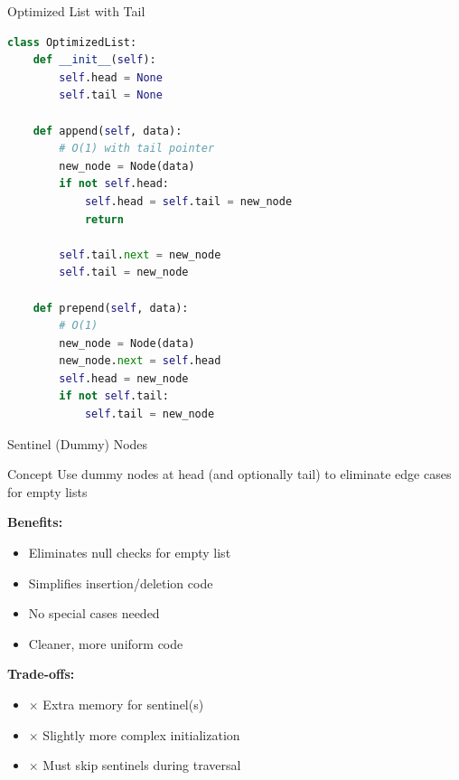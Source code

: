\documentclass[aspectratio=169,xcolor=dvipsnames]{beamer}
\begin{document}
\begin{frame}[fragile]{Optimized List with Tail}
\begin{lstlisting}[language=Python, basicstyle=\small\ttfamily]
class OptimizedList:
    def __init__(self):
        self.head = None
        self.tail = None

    def append(self, data):
        # O(1) with tail pointer
        new_node = Node(data)
        if not self.head:
            self.head = self.tail = new_node
            return

        self.tail.next = new_node
        self.tail = new_node

    def prepend(self, data):
        # O(1)
        new_node = Node(data)
        new_node.next = self.head
        self.head = new_node
        if not self.tail:
            self.tail = new_node
\end{lstlisting}
\end{frame}

\begin{frame}{Sentinel (Dummy) Nodes}
  \begin{block}{Concept}
    Use dummy nodes at head (and optionally tail) to eliminate edge cases for empty lists
  \end{block}

  \vspace{0.3cm}
  \textbf{Benefits:}
  \begin{itemize}
    \item \checkmark Eliminates null checks for empty list
    \item \checkmark Simplifies insertion/deletion code
    \item \checkmark No special cases needed
    \item \checkmark Cleaner, more uniform code
  \end{itemize}

  \vspace{0.3cm}
  \textbf{Trade-offs:}
  \begin{itemize}
    \item $\times$ Extra memory for sentinel(s)
    \item $\times$ Slightly more complex initialization
    \item $\times$ Must skip sentinels during traversal
  \end{itemize}
\end{frame}
\end{document}
